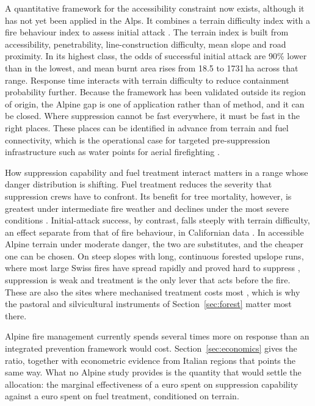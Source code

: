 \documentclass[11pt,a4paper]{article}
\begin{document}
A quantitative framework for the accessibility constraint now exists, although it has not yet been applied in the Alps. It combines a terrain difficulty index with a fire behaviour index to assess initial attack \citep{cardil_assessing_2025}. The terrain index is built from accessibility, penetrability, line-construction difficulty, mean slope and road proximity. In its highest class, the odds of successful initial attack are 90\% lower than in the lowest, and mean burnt area rises from 18.5 to 1731\,ha across that range. Response time interacts with terrain difficulty to reduce containment probability further. Because the framework has been validated outside its region of origin, the Alpine gap is one of application rather than of method, and it can be closed. Where suppression cannot be fast everywhere, it must be fast in the right places. These places can be identified in advance from terrain and fuel connectivity, which is the operational case for targeted pre-suppression infrastructure such as water points for aerial firefighting \citep{conedera_linking_2024}.

How suppression capability and fuel treatment interact matters in a range whose danger distribution is shifting. Fuel treatment reduces the severity that suppression crews have to confront. Its benefit for tree mortality, however, is greatest under intermediate fire weather and declines under the most severe conditions \citep{brodie_forest_2024}. Initial-attack success, by contrast, falls steeply with terrain difficulty, an effect separate from that of fire behaviour, in Californian data \citep{cardil_assessing_2025}. In accessible Alpine terrain under moderate danger, the two are substitutes, and the cheaper one can be chosen. On steep slopes with long, continuous forested upslope runs, where most large Swiss fires have spread rapidly and proved hard to suppress \citep{conedera_linking_2024}, suppression is weak and treatment is the only lever that acts before the fire. These are also the sites where mechanised treatment costs most \citep{dinca_timber_2025}, which is why the pastoral and silvicultural instruments of Section~\ref{sec:forest} matter most there.

Alpine fire management currently spends several times more on response than an integrated prevention framework would cost. Section~\ref{sec:economics} gives the ratio, together with econometric evidence from Italian regions that points the same way. What no Alpine study provides is the quantity that would settle the allocation: the marginal effectiveness of a euro spent on suppression capability against a euro spent on fuel treatment, conditioned on terrain.
\end{document}
